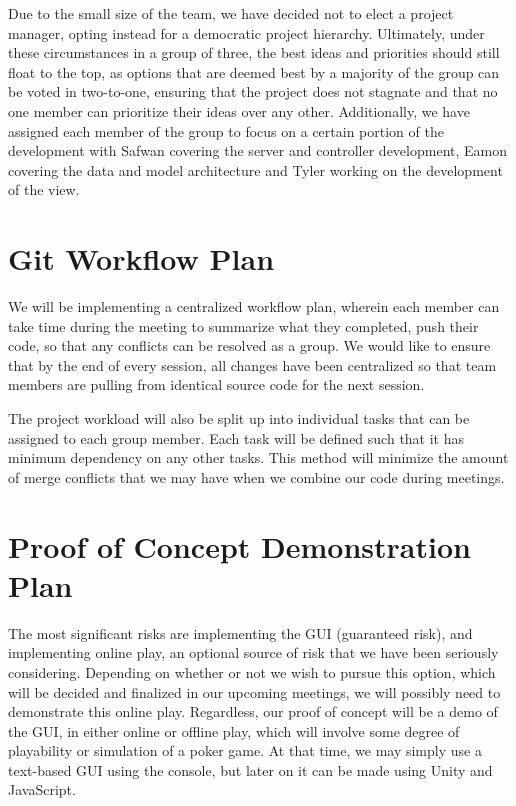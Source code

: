 \documentclass{article}
\begin{document}
Due to the small size of the team, we have decided not to elect a project manager, opting instead for a democratic project hierarchy. Ultimately, under these circumstances in a group of three, the best ideas and priorities should still float to the top, as options that are deemed best by a majority of the group can be voted in two-to-one, ensuring that the project does not stagnate and that no one member can prioritize their ideas over any other. Additionally, we have assigned each member of the group to focus on a certain portion of the development with Safwan covering the server and controller development, Eamon covering the data and model architecture and Tyler working on the development of the view.

\section{Git Workflow Plan}

We will be implementing a centralized workflow plan, wherein each member can take time during the meeting to summarize what they completed, push their code, so that any conflicts can be resolved as a group. We would like to ensure that by the end of every session, all changes have been centralized so that team members are pulling from identical source code for the next session.

The project workload will also be split up into individual tasks that can be assigned to each group member. Each task will be defined such that it has minimum dependency on any other tasks. This method will minimize the amount of merge conflicts that we may have when we combine our code during meetings. 

\section{Proof of Concept Demonstration Plan}

The most significant risks are implementing the GUI (guaranteed risk), and implementing online play, an optional source of risk that we have been seriously considering. Depending on whether or not we wish to pursue this option, which will be decided and finalized in our upcoming meetings, we will possibly need to demonstrate this online play. Regardless, our proof of concept will be a demo of the GUI, in either online or offline play, which will involve some degree of playability or simulation of a poker game. At that time, we may simply use a text-based GUI using the console, but later on it can be made using Unity and JavaScript. 
\end{document}
